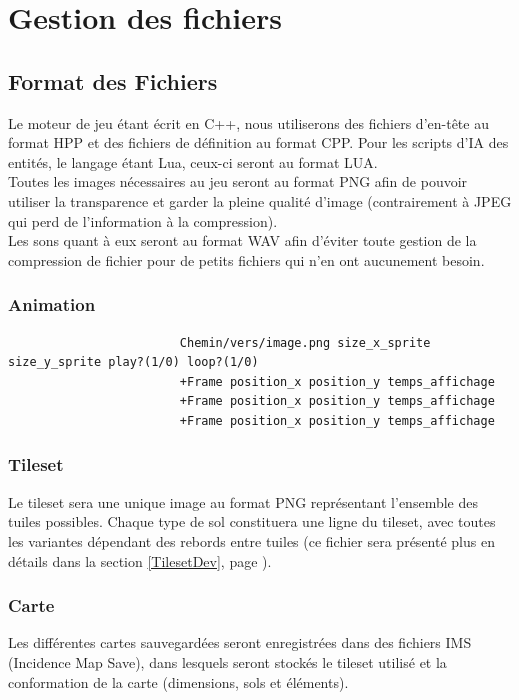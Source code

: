 \documentclass[a4paper]{memoir}
\begin{document}
		\section{Gestion des fichiers}
			\subsection{Format des Fichiers}
				Le moteur de jeu étant écrit en C++, nous utiliserons des fichiers d'en-tête au format HPP et des fichiers de définition au format CPP. Pour les scripts d'IA des entités, le langage étant Lua, ceux-ci seront au format LUA.\\
				Toutes les images nécessaires au jeu seront au format PNG afin de pouvoir utiliser la transparence et garder la pleine qualité d'image (contrairement à JPEG qui perd de l'information à la compression).\\
				Les sons quant à eux seront au format WAV afin d'éviter toute gestion de la compression de fichier pour de petits fichiers qui n'en ont aucunement besoin.

				\subsubsection{Animation}
					\begin{verbatim}
						Chemin/vers/image.png size_x_sprite size_y_sprite play?(1/0) loop?(1/0)
						+Frame position_x position_y temps_affichage
						+Frame position_x position_y temps_affichage
						+Frame position_x position_y temps_affichage
					\end{verbatim}
			
				\subsubsection{Tileset}
					Le tileset sera une unique image au format PNG représentant l'ensemble des tuiles possibles. Chaque type de sol constituera une ligne du tileset, avec toutes les variantes dépendant des rebords entre tuiles (ce fichier sera présenté plus en détails dans la section \ref{TilesetDev}, page \pageref{TilesetDev}).

				\subsubsection{Carte}
					Les différentes cartes sauvegardées seront enregistrées dans des fichiers IMS (Incidence Map Save), dans lesquels seront stockés le tileset utilisé et la conformation de la carte (dimensions, sols et éléments).
			
\end{document}
